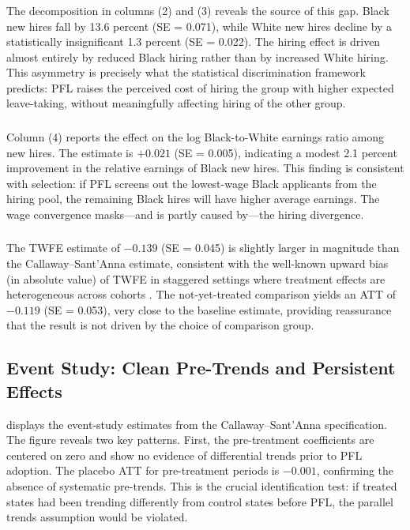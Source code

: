 \documentclass[12pt]{article}
\begin{document}


\subsubsection*{}
The decomposition in columns (2) and (3) reveals the source of this gap. Black new hires fall by 13.6 percent (SE = 0.071), while White new hires decline by a statistically insignificant 1.3 percent (SE = 0.022). The hiring effect is driven almost entirely by reduced Black hiring rather than by increased White hiring. This asymmetry is precisely what the statistical discrimination framework predicts: PFL raises the perceived cost of hiring the group with higher expected leave-taking, without meaningfully affecting hiring of the other group.

\subsubsection*{}
Column (4) reports the effect on the log Black-to-White earnings ratio among new hires. The estimate is $+0.021$ (SE = 0.005), indicating a modest 2.1 percent improvement in the relative earnings of Black new hires. This finding is consistent with selection: if PFL screens out the lowest-wage Black applicants from the hiring pool, the remaining Black hires will have higher average earnings. The wage convergence masks---and is partly caused by---the hiring divergence.

\subsubsection*{}
The TWFE estimate of $-0.139$ (SE = 0.045) is slightly larger in magnitude than the Callaway--Sant'Anna estimate, consistent with the well-known upward bias (in absolute value) of TWFE in staggered settings where treatment effects are heterogeneous across cohorts \citep{callaway2021, sun2021}. The not-yet-treated comparison yields an ATT of $-0.119$ (SE = 0.053), very close to the baseline estimate, providing reassurance that the result is not driven by the choice of comparison group.

\subsection{Event Study: Clean Pre-Trends and Persistent Effects}

 displays the event-study estimates from the Callaway--Sant'Anna specification. The figure reveals two key patterns. First, the pre-treatment coefficients are centered on zero and show no evidence of differential trends prior to PFL adoption. The placebo ATT for pre-treatment periods is $-0.001$, confirming the absence of systematic pre-trends. This is the crucial identification test: if treated states had been trending differently from control states before PFL, the parallel trends assumption would be violated.
\end{document}
